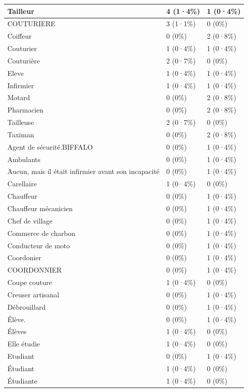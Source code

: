 \documentclass[
]{book}
\begin{document}
\begin{tabular}{l|l|l}
\hline
Tailleur & 4 (1·4\%) & 1 (0·4\%)\\
\hline
COUTURIERE & 3 (1·1\%) & 0 (0\%)\\
\hline
Coiffeur & 0 (0\%) & 2 (0·8\%)\\
\hline
Couturier & 1 (0·4\%) & 1 (0·4\%)\\
\hline
Couturière & 2 (0·7\%) & 0 (0\%)\\
\hline
Eleve & 1 (0·4\%) & 1 (0·4\%)\\
\hline
Infirmier & 1 (0·4\%) & 1 (0·4\%)\\
\hline
Motard & 0 (0\%) & 2 (0·8\%)\\
\hline
Pharmacien & 0 (0\%) & 2 (0·8\%)\\
\hline
Tailleuse & 2 (0·7\%) & 0 (0\%)\\
\hline
Taximan & 0 (0\%) & 2 (0·8\%)\\
\hline
Agent de sécurité.BIFFALO & 0 (0\%) & 1 (0·4\%)\\
\hline
Ambulants & 0 (0\%) & 1 (0·4\%)\\
\hline
Aucun, mais il était infirmier avant son incapacité & 0 (0\%) & 1 (0·4\%)\\
\hline
Carellaire & 1 (0·4\%) & 0 (0\%)\\
\hline
Chauffeur & 0 (0\%) & 1 (0·4\%)\\
\hline
Chauffeur mécanicien & 0 (0\%) & 1 (0·4\%)\\
\hline
Chef de village & 0 (0\%) & 1 (0·4\%)\\
\hline
Commerce de charbon & 0 (0\%) & 1 (0·4\%)\\
\hline
Conducteur de moto & 0 (0\%) & 1 (0·4\%)\\
\hline
Coordonier & 0 (0\%) & 1 (0·4\%)\\
\hline
COORDONNIER & 0 (0\%) & 1 (0·4\%)\\
\hline
Coupe couture & 1 (0·4\%) & 0 (0\%)\\
\hline
Creuser artisanal & 0 (0\%) & 1 (0·4\%)\\
\hline
Débrouillard & 0 (0\%) & 1 (0·4\%)\\
\hline
Élève. & 0 (0\%) & 1 (0·4\%)\\
\hline
Élèves & 1 (0·4\%) & 0 (0\%)\\
\hline
Elle étudie & 1 (0·4\%) & 0 (0\%)\\
\hline
Etudiant & 0 (0\%) & 1 (0·4\%)\\
\hline
Étudiant & 1 (0·4\%) & 0 (0\%)\\
\hline
Étudiante & 1 (0·4\%) & 0 (0\%)\\

\end{tabular}
\end{document}
